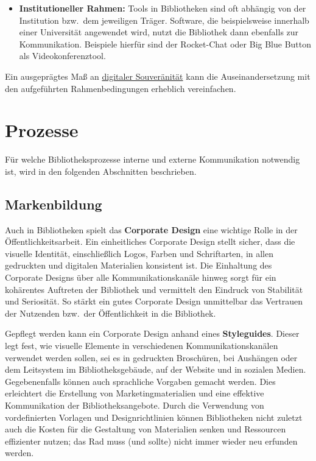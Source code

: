 \documentclass[
  11pt,
  letterpaper,
  DIV=11,
  twoside]{scrreprt}
\begin{document}
\begin{itemize}
  Dienste sollen den Anforderungen der Barrierefreie
  Informationstechnik-Verordnung (BITV 2.0) entsprechen, um einen
  inklusiven und für alle zugänglichen digitalen Raum zu schaffen, der
  keine Nutzungsgruppe ausschließt und die Diversität der Gemeinschaft
  respektiert.
\item
  \textbf{Institutioneller Rahmen:} Tools in Bibliotheken sind oft
  abhängig von der Institution bzw.~dem jeweiligen Träger. Software, die
  beispielsweise innerhalb einer Universität angewendet wird, nutzt die
  Bibliothek dann ebenfalls zur Kommunikation. Beispiele hierfür sind
  der Rocket-Chat oder Big Blue Button als Videokonferenztool.
\end{itemize}

Ein ausgeprägtes Maß an \hyperref[digitale-souveruxe4nituxe4t]{digitaler
Souveränität} kann die Auseinandersetzung mit den aufgeführten
Rahmenbedingungen erheblich vereinfachen.

\section{Prozesse}\label{prozesse-1}

Für welche Bibliotheksprozesse interne und externe Kommunikation
notwendig ist, wird in den folgenden Abschnitten beschrieben.

\subsection{Markenbildung}\label{markenbildung}

Auch in Bibliotheken spielt das \textbf{Corporate Design} eine wichtige
Rolle in der Öffentlichkeitsarbeit. Ein einheitliches Corporate Design
stellt sicher, dass die visuelle Identität, einschließlich Logos, Farben
und Schriftarten, in allen gedruckten und digitalen Materialien
konsistent ist. Die Einhaltung des Corporate Designs über alle
Kommunikationskanäle hinweg sorgt für ein kohärentes Auftreten der
Bibliothek und vermittelt den Eindruck von Stabilität und Seriosität. So
stärkt ein gutes Corporate Design unmittelbar das Vertrauen der
Nutzenden bzw.~der Öffentlichkeit in die Bibliothek.

Gepflegt werden kann ein Corporate Design anhand eines
\textbf{Styleguides}. Dieser legt fest, wie visuelle Elemente in
verschiedenen Kommunikationskanälen verwendet werden sollen, sei es in
gedruckten Broschüren, bei Aushängen oder dem Leitsystem im
Bibliotheksgebäude, auf der Website und in sozialen Medien.
Gegebenenfalls können auch sprachliche Vorgaben gemacht werden. Dies
erleichtert die Erstellung von Marketingmaterialien und eine effektive
Kommunikation der Bibliotheksangebote. Durch die Verwendung von
vordefinierten Vorlagen und Designrichtlinien können Bibliotheken nicht
zuletzt auch die Kosten für die Gestaltung von Materialien senken und
Ressourcen effizienter nutzen; das Rad muss (und sollte) nicht immer
wieder neu erfunden werden.
\end{document}
